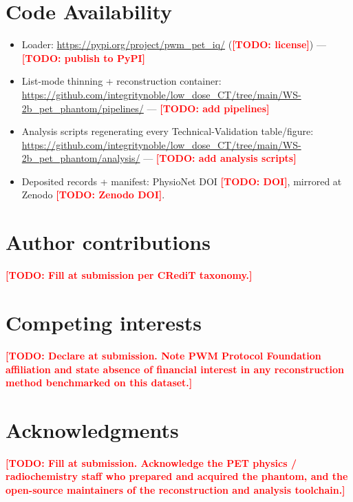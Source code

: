 \documentclass[twoside,11pt]{article}
\newcommand{\todo}[1]{\textcolor{red}{\textbf{[TODO: #1]}}}
\begin{document}
\section*{Code Availability}

\begin{itemize}
    \item Loader: \url{https://pypi.org/project/pwm_pet_iq/} (\todo{license}) --- \todo{publish to PyPI}
    \item List-mode thinning + reconstruction container:
    \url{https://github.com/integritynoble/low_dose_CT/tree/main/WS-2b_pet_phantom/pipelines/} --- \todo{add pipelines}
    \item Analysis scripts regenerating every Technical-Validation table/figure:
    \url{https://github.com/integritynoble/low_dose_CT/tree/main/WS-2b_pet_phantom/analysis/} --- \todo{add analysis scripts}
    \item Deposited records + manifest: PhysioNet DOI \todo{DOI}, mirrored at Zenodo \todo{Zenodo DOI}.
\end{itemize}

\section*{Author contributions}
\todo{Fill at submission per CRediT taxonomy.}

\section*{Competing interests}
\todo{Declare at submission. Note PWM Protocol Foundation affiliation and state absence
of financial interest in any reconstruction method benchmarked on this dataset.}

\section*{Acknowledgments}
\todo{Fill at submission. Acknowledge the PET physics / radiochemistry staff who
prepared and acquired the phantom, and the open-source maintainers of the
reconstruction and analysis toolchain.}



\end{document}
